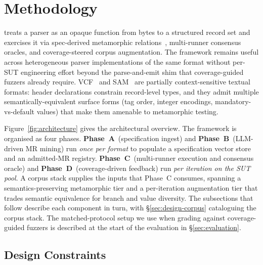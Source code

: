 
\section{Methodology}
\label{sec:design}

\biotest{} treats a parser as an opaque function from bytes to a
structured record set and exercises it via spec-derived metamorphic
relations~\citep{chen1998metamorphic,chen2018metamorphic,segura2016survey},
multi-runner consensus oracles, and coverage-steered corpus
augmentation. The framework remains useful across heterogeneous
parser implementations of the same format without per-SUT
engineering effort beyond the parse-and-emit shim that
coverage-guided fuzzers already require. VCF~\citep{danecek2011vcf}
and SAM~\citep{li2009sam} are partially context-sensitive textual
formats: header declarations constrain record-level types, and
they admit multiple semantically-equivalent surface forms (tag
order, integer encodings, mandatory-vs-default values) that make
them amenable to metamorphic testing.

Figure~\ref{fig:architecture} gives the architectural overview.
The framework is organised as four phases.
\textbf{Phase~A}~(specification ingest) and
\textbf{Phase~B}~(LLM-driven MR mining) run \emph{once per format}
to populate a specification vector store and an admitted-MR
registry. \textbf{Phase~C}~(multi-runner execution and consensus
oracle) and \textbf{Phase~D}~(coverage-driven feedback) run
\emph{per iteration on the SUT pool}. A corpus stack supplies the
inputs that Phase~C consumes, spanning a semantics-preserving
metamorphic tier and a per-iteration augmentation tier that
trades semantic equivalence for branch and value diversity. The subsections that follow describe each component in turn,
with \S\ref{sec:design-corpus} cataloguing the corpus stack.
The matched-protocol setup we use when grading \biotest{}
against coverage-guided fuzzers is described at the start of
the evaluation in \S\ref{sec:evaluation}.



\subsection{Design Constraints}
\label{sec:design-constraints}

